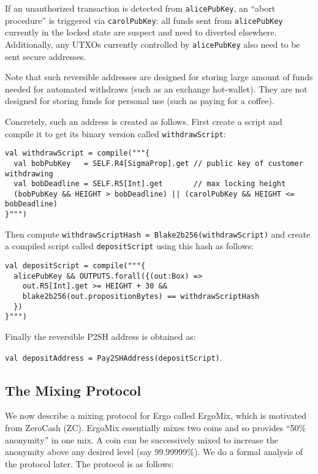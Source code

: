 \documentclass[11pt]{article}
\newcommand{\mixname}{ErgoMix\xspace}
\begin{document}
If an unauthorized transaction is detected from \texttt{alicePubKey}, an ``abort procedure'' is triggered via \texttt{carolPubKey}: all funds sent from \texttt{alicePubKey} currently in the locked state are suspect and need to diverted elsewhere. Additionally, any UTXOs currently controlled by \texttt{alicePubKey} also need to be sent secure addresses. 

Note that such reversible addresses are designed for storing large amount of funds needed for automated withdraws (such as an exchange hot-wallet). They are not designed for storing funds for personal use (such as paying for a coffee).

Concretely, such an address is created as follows. First create a script and compile it to get its binary version called \texttt{withdrawScript}:
\begin{verbatim}
val withdrawScript = compile("""{
  val bobPubKey   = SELF.R4[SigmaProp].get // public key of customer withdrawing
  val bobDeadline = SELF.R5[Int].get       // max locking height
  (bobPubKey && HEIGHT > bobDeadline) || (carolPubKey && HEIGHT <= bobDeadline)
}""")
\end{verbatim}

Then compute \texttt{withdrawScriptHash = Blake2b256(withdrawScript)} and create a compiled script called \texttt{depositScript} using this hash as follows:

\begin{verbatim}
val depositScript = compile("""{ 
  alicePubKey && OUTPUTS.forall({(out:Box) =>
    out.R5[Int].get >= HEIGHT + 30 &&
    blake2b256(out.propositionBytes) == withdrawScriptHash
  })
}""")
\end{verbatim}

Finally the reversible P2SH address is obtained as:

 \texttt{val depositAddress = Pay2SHAddress(depositScript)}.

\subsection{The Mixing Protocol}

We now describe a mixing protocol for Ergo called \mixname, which is motivated from ZeroCash (ZC). 
\mixname essentially mixes two coins and so provides ``50\% anonymity'' in one mix. A coin can be successively mixed to increase the anonymity above any desired level (say 99.99999\%). We do a formal analysis of the protocol later. The protocol is as follows:
\end{document}

